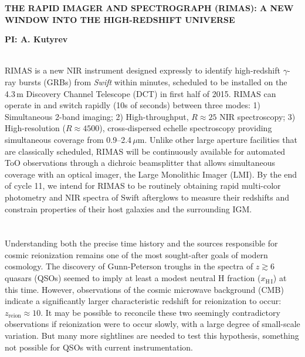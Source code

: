 \documentclass[letterpaper,11pt]{article}
\begin{document}
\pagestyle{plain}

\begin{center} 
\bfseries\uppercase{The Rapid IMAger and Spectrograph (RIMAS): A New Window
	into the High-Redshift Universe}
\end{center}
\vspace{-0.3cm}
\centerline{\bf PI: {A. Kutyrev}}
 
\smallskip\\
RIMAS is a new NIR instrument designed expressly to identify high-redshift 
$\gamma$-ray bursts (GRBs) from \textit{Swift} within minutes, scheduled to be installed on the 
4.3\,m Discovery Channel Telescope (DCT) in first half of 2015. RIMAS can operate in and switch 
rapidly (10s of seconds) between three modes: 1) Simultaneous 2-band imaging; 2) High-throughput, $R \approx 25$ 
NIR spectroscopy; 3) High-resolution ($R \approx 4500$), cross-dispersed echelle spectroscopy providing 
simultaneous coverage from 0.9--2.4\,$\mu$m. Unlike other large aperture facilities that 
are classically scheduled, RIMAS will be continuously available for automated ToO observations 
through a dichroic beamsplitter that allows simultaneous coverage with an optical imager, 
the Large Monolithic Imager (LMI). By the end of cycle 11, we intend for RIMAS to be routinely 
obtaining rapid multi-color photometry and NIR spectra of Swift afterglows to measure 
their redshifts and constrain properties of their host galaxies and the surrounding 
IGM. \\

\smallskip\\
\smallskip\\
Understanding both the precise time history and the sources responsible for cosmic
reionization remains one of the most sought-after goals of modern cosmology.  The 
discovery of Gunn-Peterson troughs in the spectra of $z \gtrsim 6$ quasars 
(QSOs\cite{bfw+01}) seemed to imply at least a modest neutral H fraction 
($x_{\mathrm{H\,I}}$) at this time.  However, observations of the cosmic microwave
background (CMB\cite{hlk+13}) indicate a significantly larger characteristic redshift 
for reionization to occur: $z_\mathrm{reion} \approx 10$.  It may be 
possible to reconcile these two seemingly contradictory observations if reionization
were to occur slowly, with a large degree of small-scale variation.  But many more
sightlines are needed to test this hypothesis, something not possible for QSOs
with current instrumentation.
\end{document}
